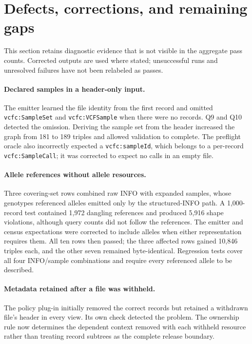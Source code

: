 \documentclass[11pt]{article}
\begin{document}
\section{Defects, corrections, and remaining gaps}\label{sec:issues}
This section retains diagnostic evidence that is not visible in the aggregate pass counts.
Corrected outputs are used where stated; unsuccessful runs and unresolved failures have not been relabeled as passes.

\paragraph{Declared samples in a header-only input.}
The emitter learned the file identity from the first record and omitted \texttt{vcfc:SampleSet} and \texttt{vcfc:VCFSample} when there were no records.
Q9 and Q10 detected the omission.
Deriving the sample set from the header increased the graph from 181 to 189 triples and allowed validation to complete.
The preflight oracle also incorrectly expected a \texttt{vcfc:sampleId}, which belongs to a per-record \texttt{vcfc:SampleCall}; it was corrected to expect no calls in an empty file.

\paragraph{Allele references without allele resources.}
Three covering-set rows combined raw INFO with expanded samples, whose genotypes referenced alleles emitted only by the structured-INFO path.
A 1,000-record test contained 1,972 dangling references and produced 5,916 shape violations, although query counts did not follow the references.
The emitter and census expectations were corrected to include alleles when either representation requires them.
All ten rows then passed; the three affected rows gained 10,846 triples each, and the other seven remained byte-identical.
Regression tests cover all four INFO/sample combinations and require every referenced allele to be described.

\paragraph{Metadata retained after a file was withheld.}
The policy plug-in initially removed the correct records but retained a withdrawn file's header in every view.
Its own check detected the problem.
The ownership rule now determines the dependent context removed with each withheld resource rather than treating record subtrees as the complete release boundary.
\end{document}
